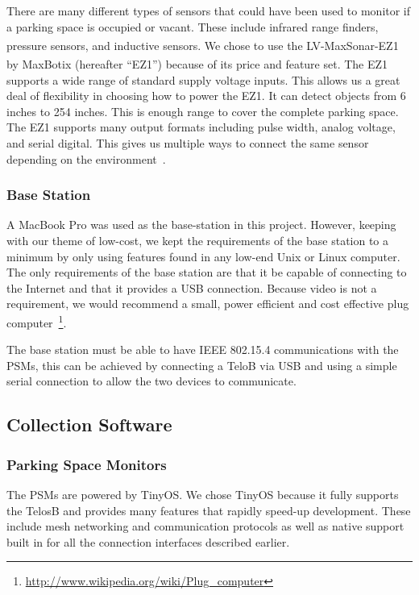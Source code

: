 \documentclass{acm_proc}
\begin{document}
There are many different types of sensors that could have been used to
monitor if a parking space is occupied or vacant.  These include infrared
range finders, pressure sensors, and inductive sensors.
We chose to use the
LV-MaxSonar\textsuperscript{\textregistered}-EZ1\textsuperscript{\texttrademark}
by MaxBotix\textsuperscript{\textregistered} (hereafter ``EZ1'')
because of its price and feature set.
The EZ1 supports a wide range of standard supply voltage inputs.
This allows us a great deal of flexibility in choosing how to power the
EZ1.
It can detect objects from 6 inches to 254 inches.
This is enough range to cover the complete parking space.
The EZ1 supports many output formats including pulse width, analog voltage,
and serial digital.
This gives us multiple ways to connect the same sensor depending on the
environment~\cite{maxbotix:maxsonar-datasheet}.

\subsubsection{Base Station}
A MacBook Pro was used as the base-station in this project.
However, keeping with our theme of low-cost, we kept the
requirements of the base station to a minimum by only using features found
in any low-end Unix or Linux computer.
The only requirements of the base station are that it be capable of
connecting to the Internet and that it provides a USB connection.
Because video is not a requirement, we would recommend a small, power
efficient and cost effective plug
computer~\footnote{\url{http://www.wikipedia.org/wiki/Plug_computer}}.

The base station must be able to have IEEE 802.15.4 communications with the
PSMs, this can be achieved by connecting a TeloB via USB and using a simple
serial connection to allow the two devices to communicate.  

\subsection{Collection Software}

\subsubsection{Parking Space Monitors}

The PSMs are powered by TinyOS.
We chose TinyOS because it fully supports the TelosB and provides many
features that rapidly speed-up development.
These include mesh networking and communication protocols as well as native
support built in for all the connection interfaces described earlier.
\end{document}
